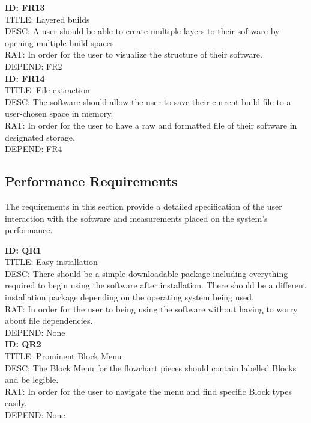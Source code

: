 \documentclass[journal,10pt,onecolumn,compsoc]{IEEEtran} \usepackage[margin=1.0in]{geometry} \usepackage{pdfpages} \usepackage{graphicx}
\begin{document}
\noindent
\textbf{ID: FR13}\\
TITLE: Layered builds\\
DESC: A user should be able to create multiple layers to their software by opening multiple build spaces.\\
RAT: In order for the user to visualize the structure of their software.\\
DEPEND: FR2\\

\noindent
\textbf{ID: FR14}\\
TITLE: File extraction\\
DESC: The software should allow the user to save their current build file to a user-chosen space in memory.\\
RAT: In order for the user to have a raw and formatted file of their software in designated storage.\\
DEPEND: FR4\\


\subsection{Performance Requirements}

The requirements in this section provide a detailed specification of the user interaction with the software and measurements placed on the system's performance.

\noindent
\textbf{ID: QR1}\\
TITLE: Easy installation\\
DESC: There should be a simple downloadable package including everything required to begin using the software after installation.
There should be a different installation package depending on the operating system being used.\\
RAT: In order for the user to being using the software without having to worry about file dependencies.\\
DEPEND: None\\

\noindent
\textbf{ID: QR2}\\
TITLE: Prominent Block Menu\\
DESC: The Block Menu for the flowchart pieces should contain labelled Blocks and be legible.\\
RAT: In order for the user to navigate the menu and find specific Block types easily.\\
DEPEND: None\\
\end{document}

